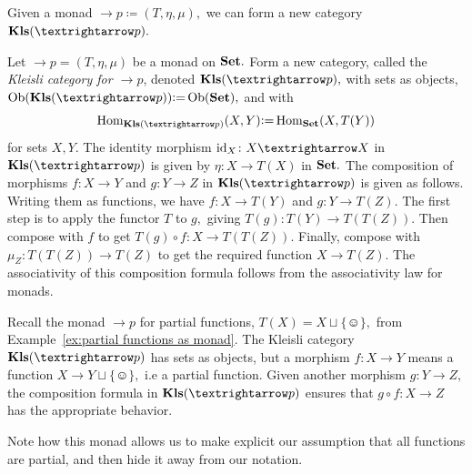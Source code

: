 \documentclass[../main/CT4S-EN-RU]{subfiles}
\begin{document}

\subsection{}\label{sec:kleisli}

\begin{blockENG}
Given a monad ${→}p{\coloneqq}(T,\eta,\mu),$ we can form a new category $\Kls({→}p).$
\end{blockENG}

\begin{blockRUS}
\end{blockRUS}

\begin{definitionENG}\label{def:kleisli}
Let ${→}p=(T,\eta,\mu)$ be a monad on ${\mathbf{Set}}.$ Form a new category, called the {\em Kleisli category for ${→}p$}, denoted $\Kls({→}p),$ with sets as objects, $\Ob(\Kls({→}p)){\coloneqq}\Ob(\Set),$ and with $$\Hom_{\Kls({→}p)}(X,Y){\coloneqq}\Hom_\Set(X,T(Y))$$ for sets $X,Y.$ The identity morphism $\id_X\colon X{→} X$ in $\Kls({→}p)$ is given by $\eta\colon X{→} T(X)$ in ${\mathbf{Set}}.$ The composition of morphisms $f\colon X{→} Y$ and $g\colon Y{→} Z$ in $\Kls({→}p)$ is given as follows. Writing them as functions, we have $f\colon X{→} T(Y)$ and $g\colon Y{→} T(Z).$ The first step is to apply the functor $T$ to $g,$ giving $T(g)\colon T(Y){→} T(T(Z)).$ Then compose with $f$ to get $T(g)\circ f\colon X{→} T(T(Z)).$ Finally, compose with $\mu_Z\colon T(T(Z)){→} T(Z)$ to get the required function $X{→} T(Z).$ The associativity of this composition formula follows from the associativity law for monads.
\end{definitionENG}

\begin{definitionRUS}\label{def:kleisli}
\end{definitionRUS}

\begin{exampleENG}
Recall the monad ${→}p$ for partial functions, $T(X)=X\sqcup{\{☺\}},$ from Example~\ref{ex:partial functions as monad}. The Kleisli category $\Kls({→}p)$ has sets as objects, but a morphism $f\colon X{→} Y$ means a function $X{→} Y\sqcup{\{☺\}},$ i.e a partial function. Given another morphism $g\colon Y{→} Z,$ the composition formula in $\Kls({→}p)$ ensures that $g\circ f\colon X{→} Z$ has the appropriate behavior.

Note how this monad allows us to make explicit our assumption that all functions are partial, and then hide it away from our notation.
\end{exampleENG}
\end{document}
